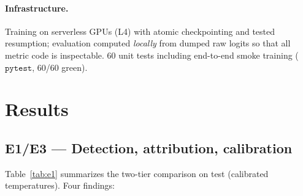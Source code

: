 \documentclass[sigconf,anonymous=false]{acmart}
\begin{document}
\paragraph{Infrastructure.} Training on serverless GPUs (L4) with atomic checkpointing and tested resumption; evaluation computed \emph{locally} from dumped raw logits so that all metric code is inspectable. 60 unit tests including end-to-end smoke training ($\mathtt{pytest}$, 60/60 green).

\section{Results}
\label{sec:results}

\subsection{E1/E3 --- Detection, attribution, calibration}
\label{sec:e1}

Table~\ref{tab:e1} summarizes the two-tier comparison on test (calibrated temperatures). Four findings:
\end{document}
